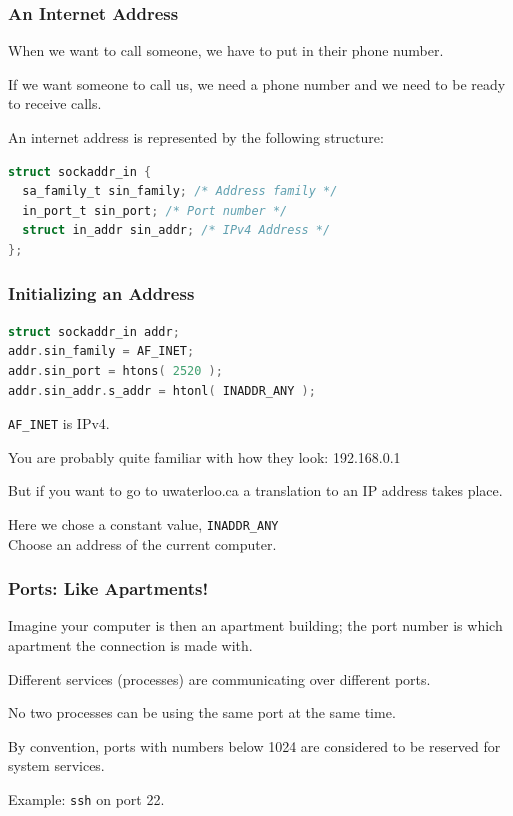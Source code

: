 \begin{frame}[fragile]
	\frametitle{An Internet Address}

	When we want to call someone, we have to put in their phone number.

	If we want someone to call us, we need a phone number and we need to be ready to receive calls.

	An internet address is represented by the following structure:
	\begin{lstlisting}[language=C]
struct sockaddr_in {
  sa_family_t sin_family; /* Address family */
  in_port_t sin_port; /* Port number */
  struct in_addr sin_addr; /* IPv4 Address */
};
\end{lstlisting}

\end{frame}


\begin{frame}[fragile]
	\frametitle{Initializing an Address}

	\begin{lstlisting}[language=C]
struct sockaddr_in addr;
addr.sin_family = AF_INET;
addr.sin_port = htons( 2520 );
addr.sin_addr.s_addr = htonl( INADDR_ANY );
\end{lstlisting}

	\texttt{AF\_INET} is IPv4.

	You are probably quite familiar with how they look: 192.168.0.1

	But if you want to go to uwaterloo.ca a translation to an IP address takes place.

	Here we chose a constant value, \texttt{INADDR\_ANY}\\
	\quad Choose an address of the current computer.

\end{frame}


\begin{frame}
	\frametitle{Ports: Like Apartments!}

	Imagine your computer is then an apartment building; the port number is which apartment the connection is made with.

	Different services (processes) are communicating over different ports.

	No two processes can be using the same port at the same time.

	By convention, ports with numbers below 1024 are considered to be reserved for system services.

	Example: \texttt{ssh} on port 22.

\end{frame}


